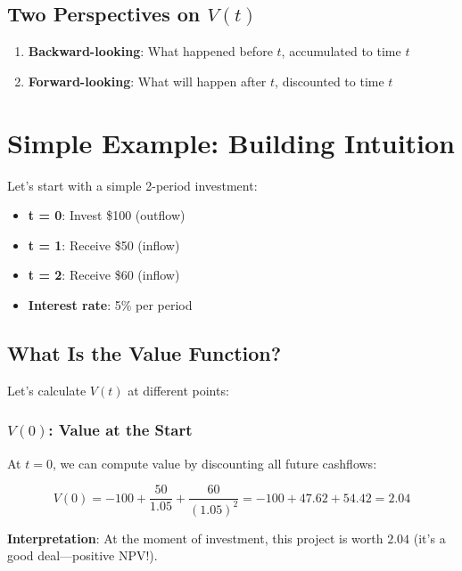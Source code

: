 \documentclass[
  letterpaper,
]{scrbook}
\providecommand{\tightlist}{%
  \setlength{\itemsep}{0pt}\setlength{\parskip}{0pt}}
\begin{document}
\subsection{\texorpdfstring{Two Perspectives on
\(V(t)\)}{Two Perspectives on V(t)}}\label{two-perspectives-on-vt}

\begin{enumerate}
\def\labelenumi{\arabic{enumi}.}
\tightlist
\item
  \textbf{Backward-looking}: What happened before \(t\), accumulated to
  time \(t\)
\item
  \textbf{Forward-looking}: What will happen after \(t\), discounted to
  time \(t\)
\end{enumerate}

\section{Simple Example: Building
Intuition}\label{simple-example-building-intuition}

Let's start with a simple 2-period investment:

\begin{itemize}
\tightlist
\item
  \textbf{t = 0}: Invest \$100 (outflow)
\item
  \textbf{t = 1}: Receive \$50 (inflow)
\item
  \textbf{t = 2}: Receive \$60 (inflow)
\item
  \textbf{Interest rate}: 5\% per period
\end{itemize}

\subsection{What Is the Value
Function?}\label{what-is-the-value-function}

Let's calculate \(V(t)\) at different points:

\subsubsection{\texorpdfstring{\(V(0)\): Value at the
Start}{V(0): Value at the Start}}\label{v0-value-at-the-start}

At \(t=0\), we can compute value by discounting all future cashflows:

\[
V(0) = -100 + \frac{50}{1.05} + \frac{60}{(1.05)^2} = -100 + 47.62 + 54.42 = 2.04
\]

\textbf{Interpretation}: At the moment of investment, this project is
worth \(2.04\) (it's a good deal---positive NPV!).
\end{document}
